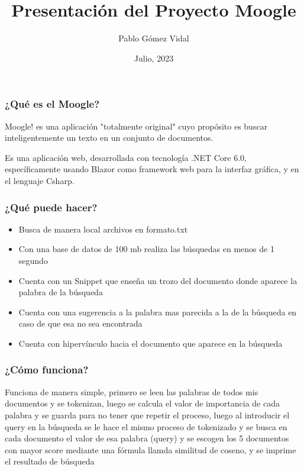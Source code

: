 \documentclass{beamer}
\begin{document}
\title{Presentación del Proyecto Moogle}
\subtitle{}
\author{Pablo Gómez Vidal}
\date{Julio, 2023}
\maketitle

\begin{frame}


\frametitle{¿Qué es el Moogle?}
Moogle! es una aplicación "totalmente original" cuyo propósito es buscar inteligentemente un texto en un conjunto de documentos.

Es una aplicación web, desarrollada con tecnología .NET Core 6.0, específicamente usando Blazor como framework web para la interfaz gráfica, y en el lenguaje Csharp.
\end{frame}

\begin{frame}
\frametitle{¿Qué puede hacer?}
\begin{itemize}
\item Busca de manera local archivos en formato.txt 
\item Con una base de datos de 100 mb realiza las búsquedas en menos de 1 segundo
\item Cuenta con un Snippet que enseña un trozo del documento donde aparece la palabra de la búsqueda
\item Cuenta con una sugerencia a la palabra mas parecida a la de la búsqueda en caso de que esa no sea encontrada
\item Cuenta con hipervínculo hacia el documento que aparece en la búsqueda
\end{itemize}
\end{frame}

\begin{frame}
\frametitle{¿Cómo funciona?}

Funciona de manera simple, primero se leen las palabras de todos mis documentos y se tokenizan, luego se calcula el valor de importancia de cada palabra y se guarda para no tener que repetir el proceso, luego al introducir el query en la búsqueda se le hace el mismo proceso de tokenizado y se busca en cada documento el valor de esa palabra (query) y se escogen los 5 documentos con mayor score mediante una fórmula llamda similitud de coseno, y se imprime el resultado de búsqueda 
\end{frame}
\end{document}
